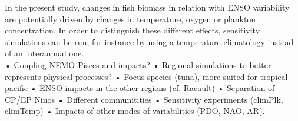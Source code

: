 In the present study, changes in fish biomass in relation with ENSO variability are potentially driven by changes in temperature, oxygen or plankton concentration. In order to distinguish these different effects, sensitivity simulations can be run, for instance by using a temperature climatology instead of an interannual one. \\

• Coupling NEMO-Pisces and impacts?  %
• Regional simulations to better represents physical processes? %
• Focus species (tuna), more suited for tropical pacific
• ENSO impacts in the other regions (cf. Racault)  
• Separation of CP/EP Ninos  %
• Different communitities
• Sensitivity experiments (climPlk, climTemp)
• Impacts of other modes of variabilities (PDO, NAO, AR).


